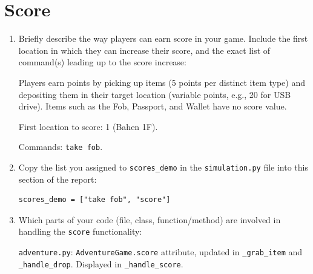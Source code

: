 \documentclass[11pt]{article}
\begin{document}
\section*{Score}
\begin{enumerate}
    \item Briefly describe the way players can earn score in your game. Include the first location in which they can increase their score, and the exact list of command(s) leading up to the score increase: 
    
    Players earn points by picking up items (5 points per distinct item type) and depositing them in their target location (variable points, e.g., 20 for USB drive). Items such as the Fob, Passport, and Wallet have no score value. 
    
    First location to score: 1 (Bahen 1F). 
    
    Commands: \texttt{take fob}.
    
    \item Copy the list you assigned to \texttt{scores\_demo} in the \texttt{simulation.py} file into this section of the report:
\begin{verbatim}
scores_demo = ["take fob", "score"]
\end{verbatim}
    
    \item Which parts of your code (file, class, function/method) are involved in handling the \texttt{score} functionality: 
    
    \texttt{adventure.py}: \texttt{AdventureGame.score} attribute, updated in \texttt{\_grab\_item} and \texttt{\_handle\_drop}. Displayed in \texttt{\_handle\_score}.
\end{enumerate}
\end{document}
